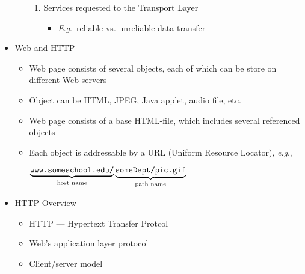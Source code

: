 \begin{itemize}
\begin{itemize}
\begin{enumerate}
          \item Services requested to the Transport Layer

            \begin{itemize}

              \item \textit{E}.\textit{g}.\  reliable vs. unreliable data transfer

            \end{itemize}

        \end{enumerate}

    \end{itemize}

  \item Web and HTTP

    \begin{itemize}

      \item Web page consists of several objects, each of which can be store on different Web servers

      \item Object can be HTML, JPEG, Java applet, audio file, etc.

      \item Web page consists of a base HTML-file, which includes several referenced objects

      \item Each object is addressable by a URL (Uniform Resource Locator), \textit{e}.\textit{g}.,

        \begin{center}
          $\underbrace{\text{\texttt{www.someschool.edu/}}}_{\text{host name}}\underbrace{\text{\texttt{someDept/pic.gif}}}_{\text{path name}}$
        \end{center}

    \end{itemize}

  \item HTTP Overview

    \begin{itemize}

      \item HTTP — Hypertext Transfer Protcol

      \item Web's application layer protocol

      \item Client/server model

        \begin{itemize}


\end{itemize}
\end{itemize}
\end{itemize}
